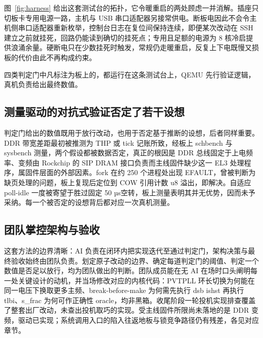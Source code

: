 图~\ref{fig:harness} 给出这套测试台的拓扑，它令暖重启的两处顾虑一并消解。插座只切板卡专用电源一路，主机与 USB 串口适配器另接常供电。断板电因此不会令主机侧串口适配器重新枚举，控制台日志在复位间保持连续，即便某次改动在 SSH 建立之前就挂死，回路仍能读到确切的挂死点；专用且足额的电源为 8 核冷启提供浪涌余量。硬断电只在少数挂死时触发，常规仍走暖重启，反复上下电既慢又损板的代价由此不再构成约束。

四类判定门中凡标注为板上的，都运行在这条测试台上，QEMU 先行验证逻辑，真机负责给出最终数值。

\subsection{测量驱动的对抗式验证否定了若干设想}

判定门给出的数值既用于放行改动，也用于否定基于推断的设想，后者同样重要。DDR 带宽差距最初被推测为 THP 或 tick 记账所致，经板上 schbench 与 sysbench 测量，两个假设都被数据否定，真正的根因是 DDR 总线固定于上电频率、变频由 Rockchip 的 SIP DRAM 接口负责而主线固件缺少这一 EL3 处理程序，属固件层面的外部因素。fork 在约 250 个进程处出现 EFAULT，曾被判断为缺页处理的问题，板上复现后定位到 COW 引用计数 u8 溢出，即解决。自适应 poll-idle 一度被寄望于胜过固定 50 µs空转，板上测量表明其并无优势，因而未予采纳。每一个被否定的设想背后都对应一次真机测量。

\subsection{团队掌控架构与验收}

这套方法的边界清晰：AI 负责在闭环内把实现迭代至通过判定门，架构决策与最终验收始终由团队负责。划定原子改动的边界、确定每道判定门的阈值、判定一个数值是否足以放行，均为团队做出的判断。团队成员能在无 AI 在场时口头阐明每一处关键设计的动机，并当场修改对应的内核代码：PVTPLL 环长切换为何能在同一电压下换取更多主频、break-before-make 为何需先执行 dsb ishst 再执行 tlbi、s\_frac 为何可作正确性 oracle，均非黑箱。收尾阶段一轮投机实现排查覆盖了整套出厂改动，未查出投机取巧的实现。受主线固件所限尚未落地的是 DDR 变频，驱动已实现；系统调用入口的陷入往返地板与锁竞争路径仍有残差，各见对应章节。

